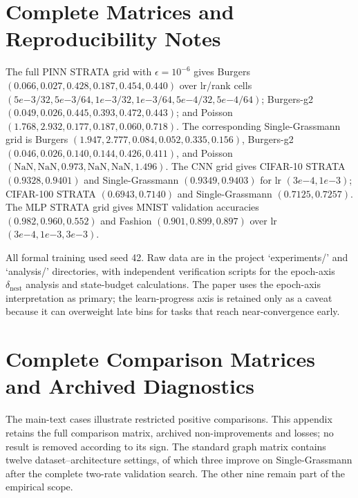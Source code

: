 


\section{Complete Matrices and Reproducibility Notes}
The full PINN STRATA grid with $\epsilon=10^{-6}$ gives Burgers $(0.066,0.027,0.428,0.187,0.454,0.440)$ over lr/rank cells $(5e{-3}/32,5e{-3}/64,1e{-3}/32,1e{-3}/64,5e{-4}/32,5e{-4}/64)$; Burgers-g2 $(0.049,0.026,0.445,0.393,0.472,0.443)$; and Poisson $(1.768,2.932,0.177,0.187,0.060,0.718)$. The corresponding Single-Grassmann grid is Burgers $(1.947,2.777,0.084,0.052,0.335,0.156)$, Burgers-g2 $(0.046,0.026,0.140,0.144,0.426,0.411)$, and Poisson $(\mathrm{NaN},\mathrm{NaN},0.973,\mathrm{NaN},\mathrm{NaN},1.496)$. The CNN grid gives CIFAR-10 STRATA $(0.9328,0.9401)$ and Single-Grassmann $(0.9349,0.9403)$ for lr $(3e{-4},1e{-3})$; CIFAR-100 STRATA $(0.6943,0.7140)$ and Single-Grassmann $(0.7125,0.7257)$. The MLP STRATA grid gives MNIST validation accuracies $(0.982,0.960,0.552)$ and Fashion $(0.901,0.899,0.897)$ over lr $(3e{-4},1e{-3},3e{-3})$.

All formal training used seed 42. Raw data are in the project `experiments/' and `analysis/' directories, with independent verification scripts for the epoch-axis $\delta_{\mathrm{nest}}$ analysis and state-budget calculations. The paper uses the epoch-axis interpretation as primary; the learn-progress axis is retained only as a caveat because it can overweight late bins for tasks that reach near-convergence early.










\FloatBarrier



\FloatBarrier
\section{Complete Comparison Matrices and Archived Diagnostics}
\label{app:full-empirical-record}
The main-text cases illustrate restricted positive comparisons. This appendix retains the full comparison matrix, archived non-improvements and losses; no result is removed according to its sign. The standard graph matrix contains twelve dataset--architecture settings, of which three improve on Single-Grassmann after the complete two-rate validation search. The other nine remain part of the empirical scope.

\FloatBarrier


